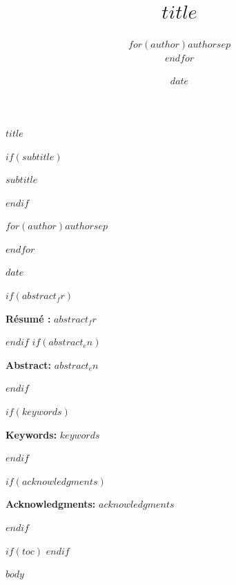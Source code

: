 \documentclass[11pt]{article}
\title{$title$}
\author{$for(author)$$author$$sep$ \\ $endfor$}
\date{$date$}
\renewcommand{\maketitle}{
  \begin{center}
  \vspace*{1cm}
  
  \begin{minipage}{\textwidth}
  \centering
  \fontsize{20}{26}\selectfont\textbf{$title$}
  \end{minipage}
  
  \vspace{2.4cm}
  
  $if(subtitle)$
  \begin{minipage}{\textwidth}
  \centering
  \fontsize{13}{16}\selectfont\itshape $subtitle$
  \end{minipage}
  $endif$
  
  \vspace{2.6cm}
  
  \begin{minipage}{\textwidth}
  \centering
  \Large
  $for(author)$$author$$sep$ \par $endfor$
  \end{minipage}
  
  \vspace{2.6cm}
  
  \Large $date$
  
  \end{center}
  \vspace{1cm}
}
\begin{document}
\maketitle
\thispagestyle{firstpage}

$if(abstract_fr)$
\begin{center}
\begin{minipage}{0.85\textwidth}
\noindent \textbf{Résumé :} $abstract_fr$
\end{minipage}
\end{center}
\vspace{0.5cm}
$endif$
$if(abstract_en)$
\begin{center}
\begin{minipage}{0.85\textwidth}
\noindent \textbf{Abstract:} $abstract_en$
\end{minipage}
\end{center}
\vspace{0.5cm}
$endif$


$if(keywords)$
\begin{center}
\begin{minipage}{0.85\textwidth}
\noindent \textbf{Keywords:} $keywords$
\end{minipage}
\end{center}
\vspace{0.5cm}
$endif$

$if(acknowledgments)$
\begin{center}
\begin{minipage}{0.85\textwidth}
\noindent \textbf{Acknowledgments:} $acknowledgments$
\end{minipage}
\end{center}
\vspace{1cm}
$endif$

$if(toc)$
\clearpage
\tableofcontents
\clearpage
$endif$

\clearpage
\pagestyle{fancy}

$body$

\end{document}
